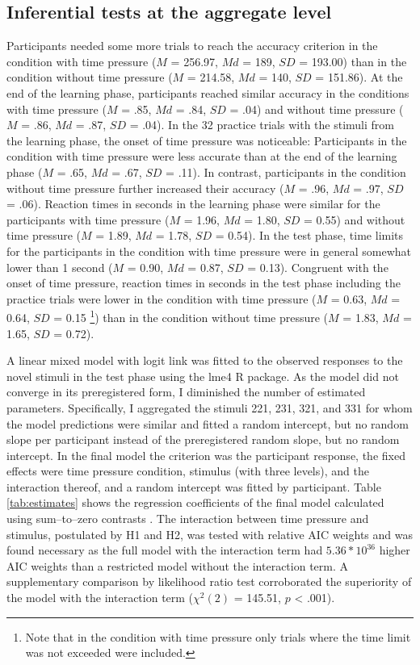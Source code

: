 \documentclass[a4paper,man,natbib]{apa6}
\begin{document}
\subsection{Inferential tests at the aggregate level}
Participants needed some more trials to reach the accuracy criterion in the condition with time pressure ($M$ = 256.97, $Md$ = 189, $SD$ = 193.00) than in the condition without time pressure ($M$ = 214.58, $Md$ = 140, $SD$ = 151.86). At the end of the learning phase, participants reached similar accuracy in the conditions with time pressure ($M$ = .85, $Md$ = .84, $SD$ = .04) and without time pressure ($M$ = .86, $Md$ = .87, $SD$ = .04). In the 32 practice trials with the stimuli from the learning phase, the onset of time pressure was noticeable: Participants in the condition with time pressure were less accurate than at the end of the learning phase ($M$ = .65, $Md$ = .67, $SD$ = .11). In contrast, participants in the condition without time pressure further increased their accuracy ($M$ = .96, $Md$ = .97, $SD$ = .06). Reaction times in seconds in the learning phase were similar for the participants with time pressure ($M$ = 1.96, $Md$ = 1.80, $SD$ = 0.55) and without time pressure ($M$ = 1.89, $Md$ = 1.78, $SD$ = 0.54). In the test phase, time limits for the participants in the condition with time pressure were in general somewhat lower than 1 second ($M$ = 0.90, $Md$ = 0.87, $SD$ = 0.13). Congruent with the onset of time pressure, reaction times in seconds in the test phase including the practice trials were lower in the condition with time pressure ($M$ = 0.63, $Md$ = 0.64, $SD$ = 0.15 \footnote{Note that in the condition with time pressure only trials where the time limit was not exceeded were included.}) than in the condition without time pressure ($M$ = 1.83, $Md$ = 1.65, $SD$ = 0.72). 

A linear mixed model with logit link was fitted to the observed responses to the novel stimuli in the test phase using the lme4 R package. As the model did not converge in its preregistered form, I diminished the number of estimated parameters. Specifically, I aggregated the stimuli 221, 231, 321, and 331 for whom the model predictions were similar and fitted a random intercept, but no random slope per participant instead of the preregistered random slope, but no random intercept. In the final model the criterion was the participant response, the fixed effects were time pressure condition, stimulus (with three levels), and the interaction thereof, and a random intercept was fitted by participant. Table \ref{tab:estimates} shows the regression coefficients of the final model calculated using sum--to--zero contrasts \citep{singmann2017introduction}. The interaction between time pressure and stimulus, postulated by H1 and H2, was tested with relative AIC weights \citep[][p. 194]{wagenmakers2004aic} and was found necessary as the full model with the interaction term had $5.36 * 10^{36}$ higher AIC weights than a restricted model without the interaction term. A supplementary comparison by likelihood ratio test corroborated the superiority of the model with the interaction term ($\chi^{2}(2)$ = 145.51, $p$ < .001). 
\end{document}
